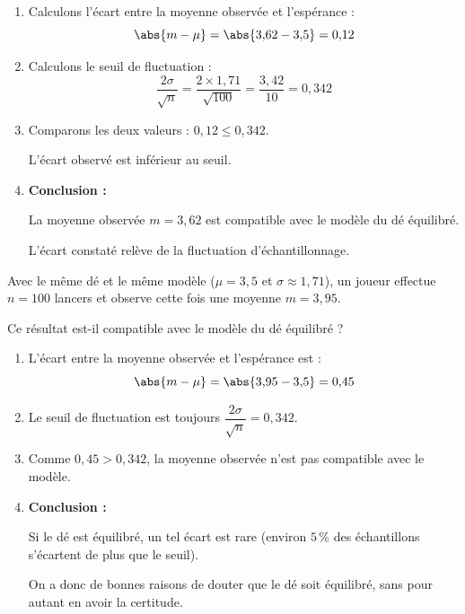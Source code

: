 \begin{methode}
\begin{correction}
\begin{enumerate}
			      Donc : $\sigma = \sigma(X) = \sqrt{\dfrac{35}{12}} \approx 1{,}71$.

			      On a :

			      \[
				      \mu = 3{,}5, \quad \sigma \approx 1{,}71, \quad n = 100, \quad m = 3{,}62
			      \]

			\item Calculons l'écart entre la moyenne observée et l'espérance :
			      \[
				      \abs{m - \mu} = \abs{3{,}62 - 3{,}5} = 0{,}12
			      \]

			\item Calculons le seuil de fluctuation :
			      \[
				      \dfrac{2\sigma}{\sqrt{n}} = \dfrac{2 \times 1{,}71}{\sqrt{100}} = \dfrac{3{,}42}{10} = 0{,}342
			      \]

			\item Comparons les deux valeurs : $0{,}12 \leq 0{,}342$.

			      L'écart observé est inférieur au seuil.
			\item \textbf{Conclusion :}

			      La moyenne observée $m = 3{,}62$ est compatible avec le modèle du dé équilibré.

			      L'écart constaté relève de la fluctuation d'échantillonnage.
		\end{enumerate}
	\end{correction}
\end{methode}

\begin{methode}
	Avec le même dé et le même modèle ($\mu = 3{,}5$ et $\sigma \approx 1{,}71$), un joueur effectue $n = 100$ lancers et observe cette fois une moyenne $m = 3{,}95$.

	Ce résultat est-il compatible avec le modèle du dé équilibré ?

	\begin{correction}
		\nline
		\begin{enumerate}
			\item L'écart entre la moyenne observée et l'espérance est :
			      \[
				      \abs{m - \mu} = \abs{3{,}95 - 3{,}5} = 0{,}45
			      \]

			\item Le seuil de fluctuation est toujours $\dfrac{2\sigma}{\sqrt{n}} = 0{,}342$.
			\item Comme $0{,}45 > 0{,}342$, la moyenne observée n'est pas compatible avec le modèle.
			\item \textbf{Conclusion :}

			      Si le dé est équilibré, un tel écart est rare (environ $5\,\%$ des échantillons s'écartent de plus que le seuil).

			      On a donc de bonnes raisons de douter que le dé soit équilibré, sans pour autant en avoir la certitude.
		\end{enumerate}
	\end{correction}
\end{methode}


